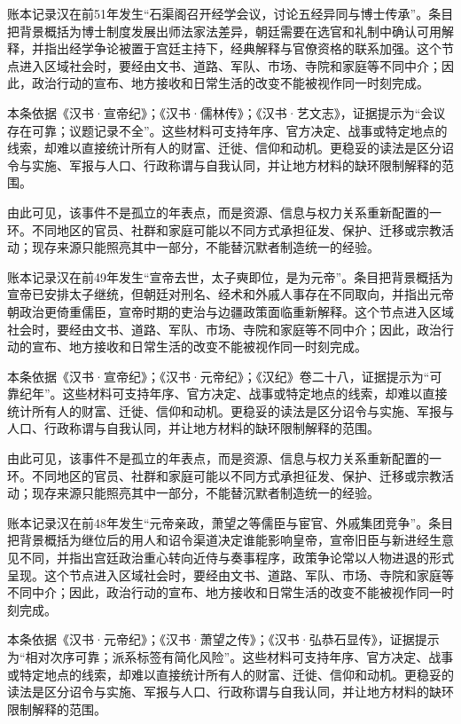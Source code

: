 账本记录汉在前51年发生“石渠阁召开经学会议，讨论五经异同与博士传承”。条目把背景概括为博士制度发展出师法家法差异，朝廷需要在选官和礼制中确认可用解释，并指出经学争论被置于宫廷主持下，经典解释与官僚资格的联系加强。这个节点进入区域社会时，要经由文书、道路、军队、市场、寺院和家庭等不同中介；因此，政治行动的宣布、地方接收和日常生活的改变不能被视作同一时刻完成。

本条依据《汉书·宣帝纪》；《汉书·儒林传》；《汉书·艺文志》，证据提示为“会议存在可靠；议题记录不全”。这些材料可支持年序、官方决定、战事或特定地点的线索，却难以直接统计所有人的财富、迁徙、信仰和动机。更稳妥的读法是区分诏令与实施、军报与人口、行政称谓与自我认同，并让地方材料的缺环限制解释的范围。

由此可见，该事件不是孤立的年表点，而是资源、信息与权力关系重新配置的一环。不同地区的官员、社群和家庭可能以不同方式承担征发、保护、迁移或宗教活动；现存来源只能照亮其中一部分，不能替沉默者制造统一的经验。

账本记录汉在前49年发生“宣帝去世，太子奭即位，是为元帝”。条目把背景概括为宣帝已安排太子继统，但朝廷对刑名、经术和外戚人事存在不同取向，并指出元帝朝政治更倚重儒臣，宣帝时期的吏治与边疆政策面临重新解释。这个节点进入区域社会时，要经由文书、道路、军队、市场、寺院和家庭等不同中介；因此，政治行动的宣布、地方接收和日常生活的改变不能被视作同一时刻完成。

本条依据《汉书·宣帝纪》；《汉书·元帝纪》；《汉纪》卷二十八，证据提示为“可靠纪年”。这些材料可支持年序、官方决定、战事或特定地点的线索，却难以直接统计所有人的财富、迁徙、信仰和动机。更稳妥的读法是区分诏令与实施、军报与人口、行政称谓与自我认同，并让地方材料的缺环限制解释的范围。

由此可见，该事件不是孤立的年表点，而是资源、信息与权力关系重新配置的一环。不同地区的官员、社群和家庭可能以不同方式承担征发、保护、迁移或宗教活动；现存来源只能照亮其中一部分，不能替沉默者制造统一的经验。

账本记录汉在前48年发生“元帝亲政，萧望之等儒臣与宦官、外戚集团竞争”。条目把背景概括为继位后的用人和诏令渠道决定谁能影响皇帝，宣帝旧臣与新进经生意见不同，并指出宫廷政治重心转向近侍与奏事程序，政策争论常以人物进退的形式呈现。这个节点进入区域社会时，要经由文书、道路、军队、市场、寺院和家庭等不同中介；因此，政治行动的宣布、地方接收和日常生活的改变不能被视作同一时刻完成。

本条依据《汉书·元帝纪》；《汉书·萧望之传》；《汉书·弘恭石显传》，证据提示为“相对次序可靠；派系标签有简化风险”。这些材料可支持年序、官方决定、战事或特定地点的线索，却难以直接统计所有人的财富、迁徙、信仰和动机。更稳妥的读法是区分诏令与实施、军报与人口、行政称谓与自我认同，并让地方材料的缺环限制解释的范围。


